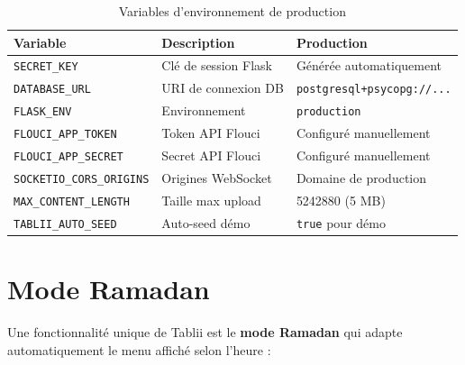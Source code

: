 \documentclass[12pt,a4paper]{report}
\begin{document}
\begin{table}[H]
    \centering
    \caption{Variables d'environnement de production}
    \label{tab:env}
    \begin{tabularx}{\textwidth}{lXl}
        \toprule
        \textbf{Variable} & \textbf{Description} & \textbf{Production} \\
        \midrule
        \texttt{SECRET\_KEY} & Clé de session Flask & Générée automatiquement \\
        \texttt{DATABASE\_URL} & URI de connexion DB & \texttt{postgresql+psycopg://...} \\
        \texttt{FLASK\_ENV} & Environnement & \texttt{production} \\
        \texttt{FLOUCI\_APP\_TOKEN} & Token API Flouci & Configuré manuellement \\
        \texttt{FLOUCI\_APP\_SECRET} & Secret API Flouci & Configuré manuellement \\
        \texttt{SOCKETIO\_CORS\_ORIGINS} & Origines WebSocket & Domaine de production \\
        \texttt{MAX\_CONTENT\_LENGTH} & Taille max upload & 5242880 (5 MB) \\
        \texttt{TABLII\_AUTO\_SEED} & Auto-seed démo & \texttt{true} pour démo \\
        \bottomrule
    \end{tabularx}
\end{table}

\section{Mode Ramadan}

Une fonctionnalité unique de Tablii est le \textbf{mode Ramadan} qui adapte automatiquement le menu affiché selon l'heure :
\end{document}
